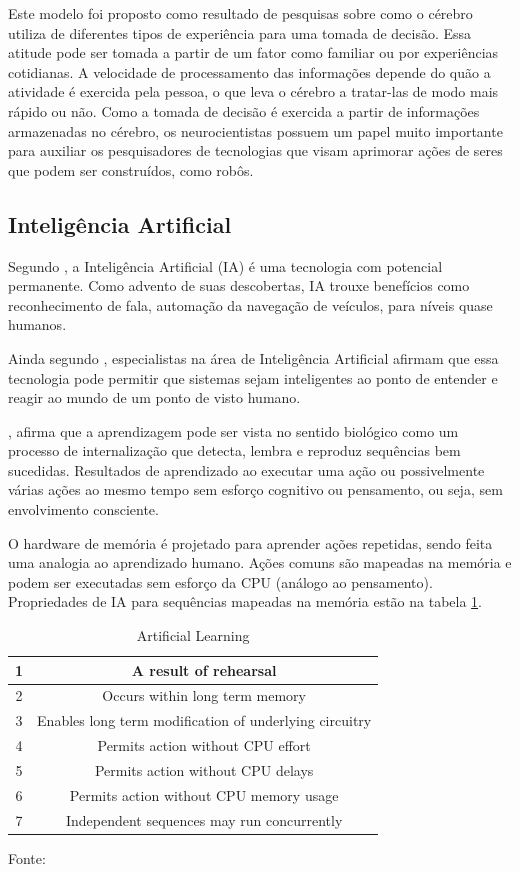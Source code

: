 Este modelo foi proposto como resultado de pesquisas sobre como o cérebro utiliza de diferentes tipos de experiência para uma tomada de decisão. Essa atitude pode ser tomada a partir de um fator como familiar ou por experiências cotidianas. A velocidade de processamento das informações depende do quão a atividade é exercida pela pessoa, o que leva o cérebro a tratar-las de modo mais rápido ou não. Como a tomada de decisão é exercida a partir de informações armazenadas no cérebro, os neurocientistas possuem um papel muito importante para auxiliar os pesquisadores de tecnologias que visam aprimorar ações de seres que podem ser construídos, como robôs.

\subsection{Inteligência Artificial}
\label{subsec:artificial}

Segundo \cite{anthes}, a Inteligência Artificial (IA) é uma tecnologia com potencial permanente. Como advento de suas descobertas, IA trouxe benefícios como reconhecimento de fala, automação da navegação de veículos, para níveis quase humanos.

Ainda segundo \cite{anthes}, especialistas na área de Inteligência Artificial afirmam que essa tecnologia pode permitir que sistemas sejam inteligentes ao ponto de entender e reagir ao mundo de um ponto de visto humano. 

\cite{john}, afirma que a aprendizagem pode ser vista no sentido biológico como um processo de internalização que detecta, lembra e reproduz sequências bem sucedidas. Resultados de aprendizado ao executar uma ação ou possivelmente várias ações ao mesmo tempo sem esforço cognitivo ou pensamento, ou seja, sem envolvimento consciente.

O hardware de memória é projetado para aprender ações repetidas, sendo feita uma analogia ao aprendizado humano. Ações comuns são mapeadas na memória e podem ser executadas sem esforço da CPU (análogo ao pensamento). Propriedades de IA para sequências mapeadas na memória estão na tabela \ref{tab:artificial}.

\begin{table}[H]
\centering
\begin{tabular}{|c|c|}
\hline
1 & A result of rehearsal                    \\ \hline
2 & Occurs within long term memory \\ \hline
3 & Enables long term modification of underlying circuitry \\ \hline
4 & Permits action without CPU effort \\ \hline
5 & Permits action without CPU delays \\ \hline
6 & Permits action without CPU memory usage \\ \hline
7 & Independent sequences may run concurrently \\ \hline
\end{tabular}
\caption{Artificial Learning}
Fonte: \cite{john}
\label{tab:artificial}
\end{table}

